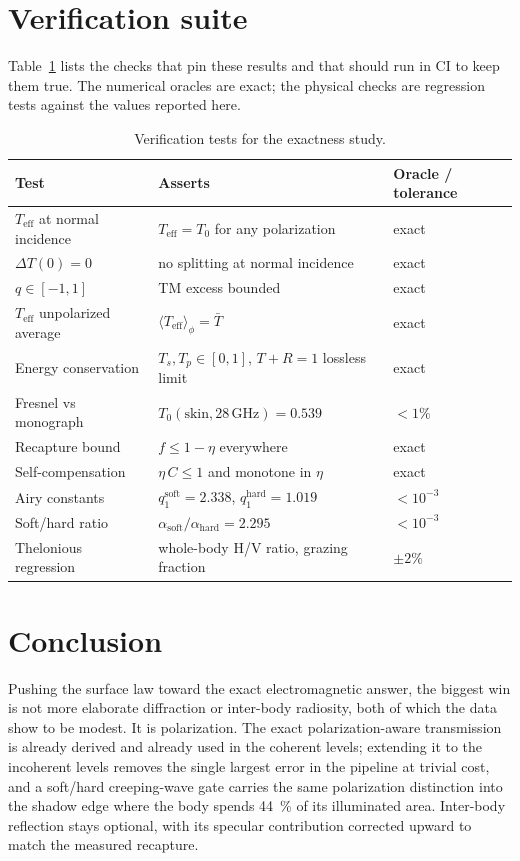\documentclass[11pt]{article}
\newcommand{\Teff}{\ensuremath{T_{\mathrm{eff}}}}
\newcommand{\Tavg}{\ensuremath{\bar{T}}}
\begin{document}
\section{Verification suite}

Table~\ref{tab:tests} lists the checks that pin these results and that
should run in CI to keep them true. The numerical oracles are exact; the
physical checks are regression tests against the values reported here.

\begin{table}[!htb]
\centering
\caption{Verification tests for the exactness study.}
\label{tab:tests}
\begin{tabular}{lll}
\toprule
Test & Asserts & Oracle / tolerance \\
\midrule
$\Teff$ at normal incidence & $\Teff = T_0$ for any polarization & exact \\
$\Delta T(0)=0$ & no splitting at normal incidence & exact \\
$q\in[-1,1]$ & TM excess bounded & exact \\
$\Teff$ unpolarized average & $\langle\Teff\rangle_\phi = \Tavg$ & exact \\
Energy conservation & $T_s,T_p\in[0,1]$, $T+R=1$ lossless limit & exact \\
Fresnel vs monograph & $T_0(\text{skin},28\,\text{GHz})=0.539$ & $<1\%$ \\
Recapture bound & $f \le 1-\eta$ everywhere & exact \\
Self-compensation & $\eta\,C \le 1$ and monotone in $\eta$ & exact \\
Airy constants & $q_1^{\text{soft}}=2.338$, $q_1^{\text{hard}}=1.019$ & $<10^{-3}$ \\
Soft/hard ratio & $\alpha_{\text{soft}}/\alpha_{\text{hard}} = 2.295$ & $<10^{-3}$ \\
Thelonious regression & whole-body H/V ratio, grazing fraction & $\pm 2\%$ \\
\bottomrule
\end{tabular}
\end{table}

\section{Conclusion}

Pushing the surface law toward the exact electromagnetic answer, the biggest
win is not more elaborate diffraction or inter-body radiosity, both of which
the data show to be modest. It is polarization. The exact polarization-aware
transmission is already derived and already used in the coherent levels;
extending it to the incoherent levels removes the single largest error in
the pipeline at trivial cost, and a soft/hard creeping-wave gate carries the
same polarization distinction into the shadow edge where the body spends
\SI{44}{\percent} of its illuminated area. Inter-body reflection stays
optional, with its specular contribution corrected upward to match the
measured recapture.
\end{document}
